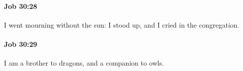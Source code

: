 		\paragraph{Job 30:28} %
			\label{JOB-30-28}

			I went mourning without the sun: I stood up, and I cried in the congregation.


		\paragraph{Job 30:29} %
			\label{JOB-30-29}

			I am a brother to dragons, and a companion to owls.


